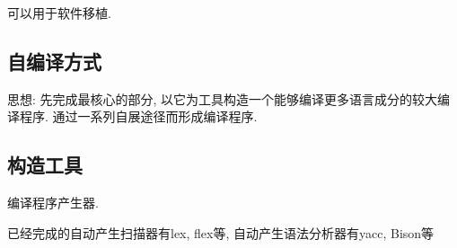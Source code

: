         可以用于软件移植.

    \subsection{自编译方式}

        思想: 先完成最核心的部分, 以它为工具构造一个能够编译更多语言成分的较大编译程序. 通过一系列自展途径而形成编译程序.

    \subsection{构造工具}

        编译程序产生器.

        已经完成的自动产生扫描器有lex, flex等, 自动产生语法分析器有yacc, Bison等

